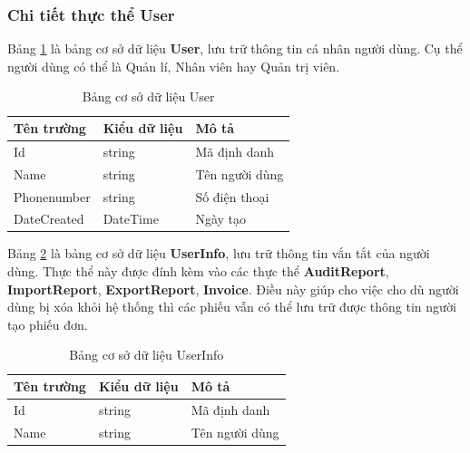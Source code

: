 \documentclass[../DoAn.tex]{subfiles}
\begin{document}
\subsubsection{Chi tiết thực thể User}
\label{subsubsection:detaildesign-database-user}
Bảng \ref{table:database_user} là bảng cơ sở dữ liệu \textbf{User}, lưu trữ thông tin cá nhân người dùng. Cụ thể người dùng có thể là Quản lí, Nhân viên hay Quản trị viên.
\begin{table}[H]
    \centering
    \begin{tabularx}{\textwidth}{|p{4cm}|p{3cm}|X|}
        \hline
        \textbf{Tên trường} & \textbf{Kiểu dữ liệu} & \textbf{Mô tả} \\ \hline
        Id                  & string                & Mã định danh   \\ \hline
        Name                & string                & Tên người dùng \\ \hline
        Phonenumber         & string                & Số điện thoại  \\ \hline
        DateCreated         & DateTime              & Ngày tạo       \\ \hline
    \end{tabularx}
    \caption{Bảng cơ sở dữ liệu User}
    \label{table:database_user}
\end{table}
\break

Bảng \ref{table:database_userinfo} là bảng cơ sở dữ liệu \textbf{UserInfo}, lưu trữ thông tin vắn tắt của người dùng. Thực thể này được đính kèm vào các thực thể \textbf{AuditReport}, \textbf{ImportReport}, \textbf{ExportReport}, \textbf{Invoice}. Điều này giúp cho việc cho dù người dùng bị xóa khỏi hệ thống thì các phiếu vẫn có thể lưu trữ được thông tin người tạo phiếu đơn.
\begin{table}[H]
    \centering
    \begin{tabularx}{\textwidth}{|p{4cm}|p{3cm}|X|}
        \hline
        \textbf{Tên trường} & \textbf{Kiểu dữ liệu} & \textbf{Mô tả} \\ \hline
        Id                  & string                & Mã định danh   \\ \hline
        Name                & string                & Tên người dùng \\ \hline
    \end{tabularx}
    \caption{Bảng cơ sở dữ liệu UserInfo}
    \label{table:database_userinfo}
\end{table}
\end{document}
